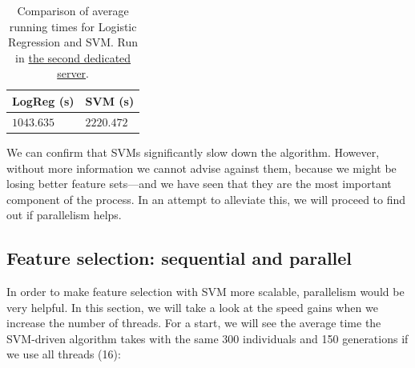 		\vspace{0.3cm}

		\begin{table}[h]

	        \centering
	        \setlength\arrayrulewidth{0.8pt}

	        \begin{tabular}{| >{\centering\arraybackslash}m{0.9in} | >{\centering\arraybackslash}m{0.9in} |}

	            \hline
	            \rowcolor{RoyalBlue}
	            \textbf{LogReg (s)} & \textbf{SVM (s)} \\
	            \hline
	            $1043.635$ & $2220.472$ \\
	            \hline

	        \end{tabular}

	        \caption[Average running times: Logistic Regression versus SVM]{Comparison of average running times for Logistic Regression and SVM. Run in \hyperlink{server:secondserver}{the second dedicated server}.}\label{table:logreg_svm_speed}

	    \end{table}

	    We can confirm that \acs{SVM}s significantly slow down the algorithm. However, without more information we cannot advise against them, because we might be losing better feature sets---and we have seen that they are the most important component of the process. In an attempt to alleviate this, we will proceed to find out if parallelism helps.

	\subsection{Feature selection: sequential and parallel}

		In order to make feature selection with \acs{SVM} more scalable, parallelism would be very helpful. In this section, we will take a look at the speed gains when we increase the number of threads. For a start, we will see the average time the \acs{SVM}-driven algorithm takes with the same 300 individuals and 150 generations if we use all threads (16):

		\vspace{0.1cm}

